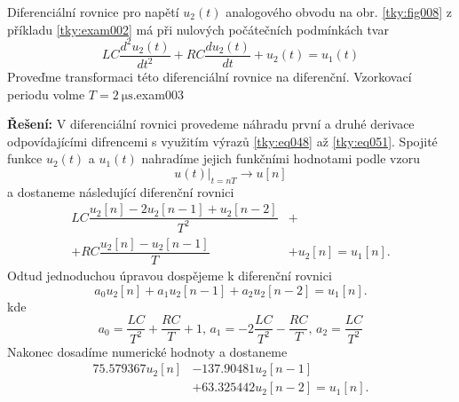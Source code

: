 \begin{tkyexam}{Diferenciální rovnice pro napětí \(u_2(t)\) analogového obvodu na obr.
  \ref{tky:fig008} z příkladu \ref{tky:exam002} má při nulových počátečních podmínkách tvar
  \begin{equation*}
    LC\frac{d^2u_2(t)}{dt^2}+RC\frac{du_2(t)}{dt}+u_2(t)=u_1(t)
  \end{equation*}
  Proveďme transformaci této diferenciální rovnice na diferenční. Vzorkovací periodu volme \(T =
  \SI{2}{\us}\).}{exam003}

  \noindent\textbf{Řešení:}
  V diferenciální rovnici provedeme náhradu první a druhé derivace odpovídajícími difrencemi s
  využitím výrazů \ref{tky:eq048} až \ref{tky:eq051}. Spojité funkce \(u_2(t)\) a \(u_1(t)\)
  nahradíme jejich funkčními hodnotami podle vzoru
  \begin{equation*}
    \left.u(t)\right\rvert_{t=nT}  \rightarrow u[n]
  \end{equation*}
  a dostaneme následující diferenční rovnici
  \begin{align*}
      LC\dfrac{u_2[n] - 2u_2[n-1]    + u_2[n-2]}{T^2} &+      \\
    + RC\dfrac{u_2[n] - u_2[n-1]}{T}                  &+ u_2[n]=u_1[n]. 
  \end{align*}
  Odtud jednoduchou úpravou dospějeme k diferenční rovnici
  \begin{equation*}
    a_0u_2[n] + a_1u_2[n-1] + a_2u_2[n-2]=u_1[n].
  \end{equation*}
  kde
  \begin{equation*}
    a_0 = \frac{LC}{T^2} + \frac{RC}{T} + 1, \, a_1 = -2\frac{LC}{T^2} - \frac{RC}{T}, \,  
    a_2 = \frac{LC}{T^2}
  \end{equation*}
  Nakonec dosadíme numerické hodnoty a dostaneme
  \begin{align}
    \num{75.579367}u_2[n] &- \num{137.90481}u_2[n-1]                       \nonumber \\
                          &+ \num{63.325442}u_2[n-2] = u_1[n].             \label{tky:eq061}
  \end{align}
\end{tkyexam}